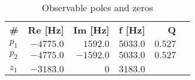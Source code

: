 \begin{table}[H]
\centering
\begin{tabular}[c]{lrrrrr}
\textbf{\#} & \textbf{Re [Hz]} & \textbf{Im [Hz]} & \textbf{f [Hz]} & \textbf{Q} \\ 
\rowcolor{myyellow}
$p_{1}$ &$-4775.0$ &$1592.0$ &$5033.0$ &$0.527$ \\ 
$p_{2}$ &$-4775.0$ &$-1592.0$ &$5033.0$ &$0.527$ \\ 
\rowcolor{myyellow}
\small{ } \\ 
$z_{1}$ &$-3183.0$ &$0$ &$3183.0$ \\ 
\end{tabular}
\caption{Observable poles and  zeros}
\end{table}

